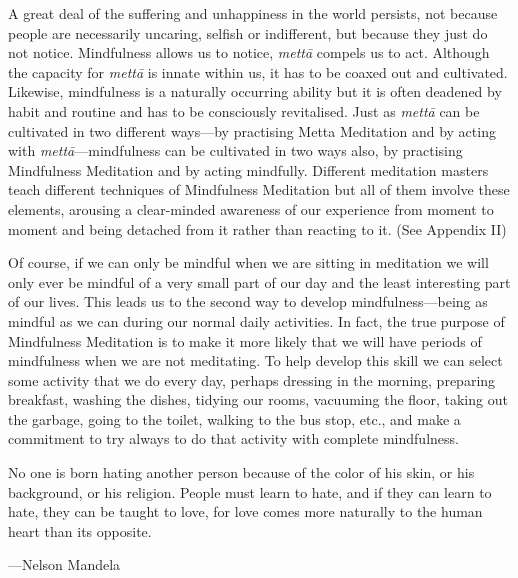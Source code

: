 \documentclass[10pt, openright]{book}
\newenvironment{epigram-2}%
{%
\setstretch{1.4}
\vspace{1em}
\noindent
\quoting[leftmargin=2cm,rightmargin=2cm]%
\begin{itshape}
\large
}%
{\end{itshape}\endquoting
}%
\newenvironment{epigram-2-cite}%
{%
\quoting[leftmargin=2cm,rightmargin=2cm]%
\noindent\normal\hspace*{\fill} 
}%
{\endquoting
}%
\begin{document}
A great deal of the suffering and unhappiness in the world persists, not because people are necessarily uncaring, selfish or indifferent, but because they just do not notice. Mindfulness allows us to notice, \textit{mettā} compels us to act. Although the capacity for \textit{mettā} is innate within us, it has to be coaxed out and cultivated. Likewise, mindfulness is a naturally occurring ability but it is often deadened by habit and routine and has to be consciously revitalised. Just as \textit{mettā} can be cultivated in two different ways—by practising Metta Meditation and by acting with \textit{mettā}—mindfulness can be cultivated in two ways also, by practising Mindfulness Meditation and by acting mindfully. Different meditation masters teach different techniques of Mindfulness Meditation but all of them involve these elements, arousing a clear-minded awareness of our experience from moment to moment and being detached from it rather than reacting to it. (See Appendix II)


Of course, if we can only be mindful when we are sitting in meditation we will only ever be mindful of a very small part of our day and the least interesting part of our lives. This leads us to the second way to develop mindfulness—being as mindful as we can during our normal daily activities. In fact, the true purpose of Mindfulness Meditation is to make it more likely that we will have periods of mindfulness when we are not meditating. To help develop this skill we can select some activity that we do every day, perhaps dressing in the morning, preparing breakfast, washing the dishes, tidying our rooms, vacuuming the floor, taking out the garbage, going to the toilet, walking to the bus stop, etc., and make a commitment to try always to do that activity with complete mindfulness.


\begin{epigram-2}
No one is born hating another person because of the color of his skin, or his background, or his religion. People must learn to hate, and if they can learn to hate, they can be taught to love, for love comes more naturally to the human heart than its opposite.
\end{epigram-2}
\begin{epigram-2-cite}
—Nelson Mandela
\end{epigram-2-cite}
\end{document}
